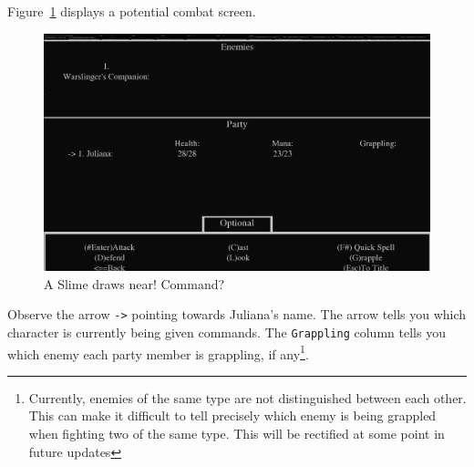 \documentclass{report}
\begin{document}
Figure~\ref{fig_combat} displays a potential combat screen.


\begin{figure}[h!]
    \includegraphics[width=\textwidth]{combat}
    \caption{A Slime draws near! Command?}
    \label{fig_combat}
\end{figure}

Observe the arrow {\color{green!50!black} \texttt{->}} pointing towards Juliana's name. The arrow tells you which character is currently being given commands. 
The \verb|Grappling| column tells you which enemy each party member is grappling, if any\footnote{Currently, enemies of the same type are not distinguished between each
other. This
can make it difficult to tell precisely which enemy is being grappled when fighting two of the same type. This will be rectified at some point in future updates}.
\end{document}
